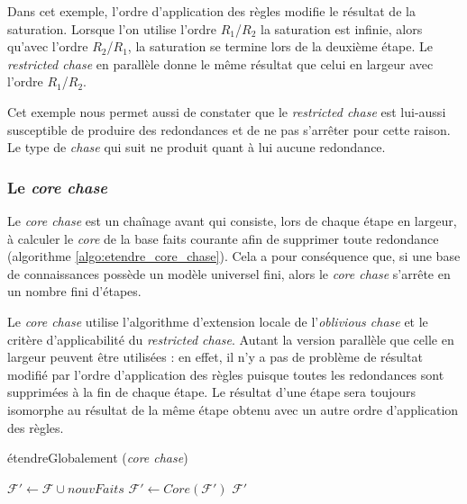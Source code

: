 Dans cet exemple, l'ordre d'application des règles modifie le résultat de la saturation. Lorsque l'on utilise l'ordre $R_1$/$R_2$ la saturation est infinie, alors qu'avec l'ordre $R_2$/$R_1$, la saturation se termine lors de la deuxième étape. Le \textit{restricted chase} en parallèle donne le même résultat que celui en largeur avec l'ordre $R_1$/$R_2$.
\par Cet exemple nous permet aussi de constater que le \textit{restricted chase} est lui-aussi susceptible de produire des redondances et de ne pas s'arrêter pour cette raison. Le type de \textit{chase} qui suit ne produit quant à lui aucune redondance.

\subsubsection{Le \textit{core chase}}\label{sec:core_chase}

Le \textit{core chase} est un chaînage avant qui consiste, lors de chaque étape en largeur, à calculer le \textit{core} de la base faits courante afin de supprimer toute redondance (algorithme \ref{algo:etendre_core_chase}).
Cela a pour conséquence que, si une base de connaissances possède un modèle universel fini, alors le \textit{core chase} s'arrête en un nombre fini d'étapes.
\par Le \textit{core chase} utilise l'algorithme d'extension locale de l'\textit{oblivious chase} et le critère d'applicabilité du \textit{restricted chase}. Autant la version parallèle que celle en largeur peuvent être utilisées : en effet, il n'y a pas de problème de résultat modifié par l'ordre d'application des règles puisque toutes les redondances sont supprimées à la fin de chaque étape. Le résultat d'une étape sera toujours isomorphe au résultat de la même étape obtenu avec un autre ordre d'application des règles.

\begin{algorithm}[!h]\label{algo:etendre_core_chase}
\caption{étendreGlobalement (\textit{core chase})}
\SetAlgoLined
\DontPrintSemicolon
\SetAlgoLined
\DontPrintSemicolon
{}
    $\mathcal{F'} \gets \mathcal{F} \cup nouvFaits$\;
    $\mathcal{F'} \gets Core(\mathcal{F'})$\;
    \Return $\mathcal{F'}$
\end{algorithm}

